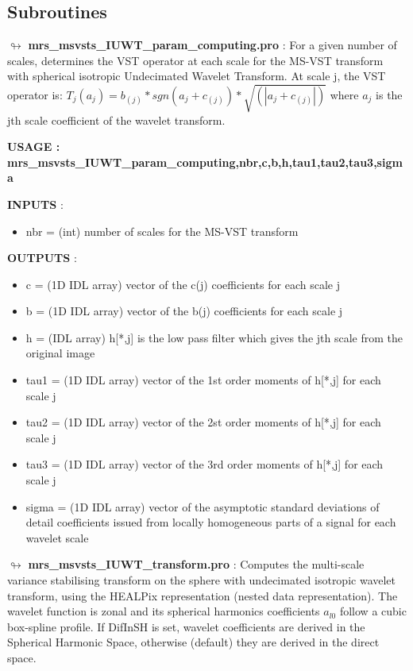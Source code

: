 \subsection{Subroutines}

\vspace{0.3cm}
$\looparrowright$ \textbf{mrs\_msvsts\_IUWT\_param\_computing.pro} :  For a given number of scales, determines the VST operator at each scale for the MS-VST transform with spherical isotropic Undecimated Wavelet Transform. At scale j, the VST operator is: $T_j(a_j) = b_{(j)} * sgn(a_j+c_{(j)}) * \sqrt{(|a_j+c_{(j)}|)}$ where $a_j$ is the jth scale coefficient of the wavelet transform.

\begin{center}
 \bf{USAGE : mrs\_msvsts\_IUWT\_param\_computing,nbr,c,b,h,tau1,tau2,tau3,sigma}
\end{center}

\textbf{INPUTS} : 
\begin{itemize}
\item{nbr = (int) number of scales for the MS-VST transform}
\end{itemize}

\textbf{OUTPUTS} : 
\begin{itemize}
\item{c = (1D IDL array) vector of the c(j) coefficients for each scale j}
\item{b = (1D IDL array) vector of the b(j) coefficients for each scale j}
\item{h = (IDL array) h[*,j] is the low pass filter which gives the jth scale from the original image}
\item{tau1 = (1D IDL array) vector of the 1st order moments of h[*,j] for each scale j}
\item{tau2 = (1D IDL array) vector of the 2st order moments of h[*,j] for each scale j}
\item{tau3 = (1D IDL array) vector of the 3rd order moments of h[*,j] for each scale j}
\item{sigma = (1D IDL array) vector of the asymptotic standard deviations of detail coefficients issued from locally homogeneous parts of a signal for each wavelet scale}
\end{itemize}

\vspace{0.3cm}
$\looparrowright$ \textbf{mrs\_msvsts\_IUWT\_transform.pro} :  Computes the multi-scale variance stabilising transform on the sphere with undecimated isotropic wavelet transform, using the HEALPix representation (nested data representation). The wavelet function is zonal and its spherical harmonics coefficients $a_{l0}$ follow a cubic box-spline profile. If DifInSH is set, wavelet coefficients are derived in the Spherical Harmonic Space, otherwise (default) they are derived in the direct space.

